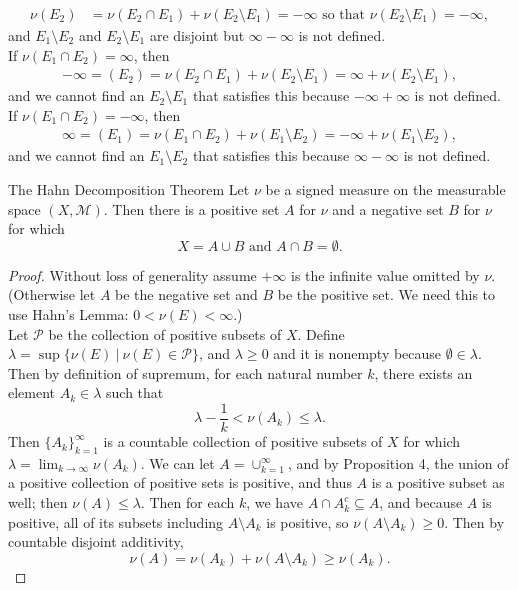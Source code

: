 \begin{flushleft}
\begin{align*}
			\nu(E_2)&=\nu(E_2\cap E_1)+\nu(E_2\setminus E_1)=-\infty\text{ so that }\nu(E_2\setminus E_1)=-\infty,
		\end{align*}
		and $E_1\setminus E_2$ and $E_2\setminus E_1$ are disjoint but $\infty-\infty$ is not defined.
		\\If $\nu(E_1\cap E_2)=\infty$, then 
		\begin{align*}
			-\infty=(E_2)=\nu(E_2\cap E_1)+\nu(E_2\setminus E_1)=\infty+\nu(E_2\setminus E_1),
		\end{align*}
		and we cannot find an $E_2\setminus E_1$ that satisfies this because $-\infty+\infty$ is not defined.
		\\If $\nu(E_1\cap E_2)=-\infty$, then 
		\begin{align*}
			\infty=(E_1)=\nu(E_1\cap E_2)+\nu(E_1\setminus E_2)=-\infty+\nu(E_1\setminus E_2),
		\end{align*}
		and we cannot find an $E_1\setminus E_2$ that satisfies this because $\infty-\infty$ is not defined.
	\begin{namedthm*}{The Hahn Decomposition Theorem}
		Let $\nu$ be a signed measure on the measurable space $(X,\mathcal{M})$.
		Then there is a positive set $A$ for $\nu$ and a negative set $B$ for $\nu$ for which
		\[
			X=A\cup B\text{ and }A\cap B=\emptyset.	
		\]
	\end{namedthm*}
	\begin{proof}
		Without loss of generality assume $+\infty$ is the infinite value omitted by $\nu$.
		(Otherwise let $A$ be the negative set and $B$ be the positive set. We need this to use Hahn's Lemma: $0<\nu(E)<\infty$.)
		\\Let $\mathcal{P}$ be the collection of positive subsets of $X$.
		Define $\lambda=\sup\{\nu(E)\ |\ \nu(E)\in\mathcal{P}\}$, and $\lambda\ge0$ and it is nonempty because $\emptyset\in\lambda$.
		Then by definition of supremum, for each natural number $k$, there exists an element $A_k\in\lambda$ such that
		\[
			\lambda-\frac{1}{k}<\nu(A_k)\le\lambda.
		\]
		Then $\{A_k\}_{k=1}^\infty$ is a countable collection of positive subsets of $X$ for which $\lambda=\lim_{k\to\infty}\nu(A_k)$.
		We can let $A=\cup_{k=1}^\infty$, and by Proposition 4, the union of a positive collection of positive sets is positive, and thus $A$ is a positive subset as well; then $\nu(A)\le\lambda$.
		Then for each $k$, we have $A\cap A_k^c\subseteq A$, and because $A$ is positive, all of its subsets including $A\setminus A_k$ is positive, so $\nu(A\setminus A_k)\ge0$.
		Then by countable disjoint additivity,
		\[
			\nu(A)=\nu(A_k)+\nu(A\setminus A_k)\ge\nu(A_k).
\]
\end{proof}
\end{flushleft}
